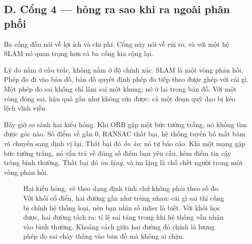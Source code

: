 \documentclass[../../deep_learning.tex]{subfiles}
\begin{document}

\subsection{D. Cổng 4 --- hỏng ra sao khi ra ngoài phân phối}
Ba cổng đầu nói về lợi ích và chi phí. Cổng này nói về rủi ro, và với một hệ SLAM nó quan trọng hơn cả ba cổng kia cộng lại.

Lý do nằm ở cấu trúc, không nằm ở độ chính xác. SLAM là một vòng phản hồi. Phép đo đi vào bản đồ, bản đồ quyết định phép đo tiếp theo được ghép với cái gì. Một phép đo sai không chỉ làm sai một khung; nó ở lại trong bản đồ. Với một vòng đóng sai, hậu quả gần như không sửa được: cả một đoạn quỹ đạo bị kéo lệch vĩnh viễn.

Bây giờ so sánh hai kiểu hỏng. Khi ORB gặp một bức tường trắng, nó không tìm được góc nào. Số điểm về gần 0, RANSAC thất bại, hệ thống tuyên bố mất bám và chuyển sang định vị lại. Thất bại đó \emph{ồn ào}: nó tự báo cáo. Khi một mạng gặp bức tường trắng, nó vẫn trả về đúng số điểm bạn yêu cầu, kèm điểm tin cậy trông bình thường. Thất bại đó \emph{im lặng}, và im lặng là chỗ chết người trong một vòng phản hồi.

\begin{figure}[H]\centering
{}
\caption{Hai kiểu hỏng, vẽ theo dạng định tính chứ không phải theo số đo. Với khối cổ điển, hai đường gần như trùng nhau: cái gì sai thì cũng bị chính hệ thống loại, nên bạn nhìn số inlier là biết. Với khối học được, hai đường tách ra: tỉ lệ sai tăng trong khi hệ thống vẫn nhận vào bình thường. Khoảng cách giữa hai đường đỏ chính là lượng phép đo sai chảy thẳng vào bản đồ mà không ai chặn.}
\label{fig:f27-hong-im-lang}
\end{figure}
\end{document}
